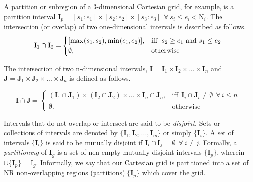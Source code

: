 \documentclass[11pt]{article}
\begin{document}
A partition or subregion of a 3-dimensional Cartesian grid, for example,  is a partition interval $\textbf{I}_{p} = [s_1:e_1]\times[s_2:e_2]\times[s_3:e_3]~~\forall~ s_i \leq e_i < \text{N}_i$. The intersection (or overlap) of two one-dimensional intervals is described as follows.
\begin{equation} 
\textbf{I}_{1}\cap\textbf{I}_{2} =
\begin{cases}
[\max_{}(s_1,s_2),\min_{}(e_1,e_2)], & \text{iff}~~s_{2}\geq e_{1}$ \text{and} $s_{1} \leq e_{2} \\
\emptyset, & \text{otherwise}
\end{cases}
\end{equation}

The intersection of two n-dimensional intervals, $\textbf{I} = \textbf{I}_{1}\times\textbf{I}_{2}\times...\times\textbf{I}_{n}$ and $\textbf{J} = \textbf{J}_{1}\times\textbf{J}_{2}\times...\times\textbf{J}_{n}$ is defined as follows.

\begin{equation}                                                                                                  
\textbf{I}\cap\textbf{J} =                                                                               
\begin{cases}                                                                                                     
(\textbf{I}_{1}\cap\textbf{J}_{1})\times(\textbf{I}_{2}\cap\textbf{J}_{2})\times...\times\textbf{I}_{n}\cap\textbf{J}_{n}, & \text{iff}~~\textbf{I}_{i}\cap\textbf{J}_{i}\neq\emptyset~~\forall~i\leq n\\                
\emptyset, & \text{otherwise}                                                                                     
\end{cases}                                                                                                       
\end{equation}

Intervals that do not overlap or intersect are said to be \textit{disjoint}. Sets or collections of intervals are denoted by $\{\textbf{I}_1,\textbf{I}_2,...,\textbf{I}_m\}$ or simply $\{\textbf{I}_{i}\}$. A set of intervals $\{\textbf{I}_i\}$ is said to be mutually disjoint if $\textbf{I}_i\cap\textbf{I}_j = \emptyset~~\forall~i\neq j$. Formally, a \textit{partitioning} of $\textbf{I}_{g}$ is a set of non-empty mutually disjoint intervals $\{\textbf{I}_{p}\}$, wherein $\cup\{\textbf{I}_{p}\} = \textbf{I}_{g}$. Informally, we say that our Cartesian grid is partitioned into a set of $\text{NR}$ non-overlapping regions (partitions) $\{\textbf{I}_{p}\}$ which cover the grid. 
\end{document}
